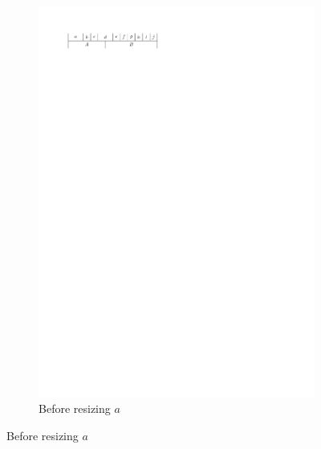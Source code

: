   \begin{figure}[t]
    \centering
    \begin{subfigure}[b]{0.45 \textwidth}
      \centering
      \includegraphics{introduction/img/2sidedBefore.pdf}
      \caption{Before resizing $a$}
      \label{fig:intro:2sidedBefore}
    \end{subfigure}


\end{figure}
